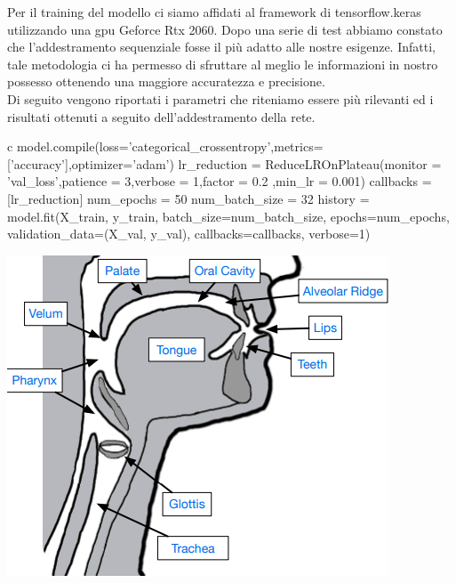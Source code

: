 \documentclass[12pt, a4paper]{article}
\begin{document}
Per il training del modello ci siamo affidati al framework di tensorflow.keras utilizzando una gpu Geforce Rtx 2060. Dopo una serie di test abbiamo constato che l'addestramento sequenziale fosse il più adatto alle nostre esigenze. Infatti, tale metodologia ci ha permesso di sfruttare al meglio le informazioni in nostro possesso ottenendo una maggiore accuratezza e precisione.\\
Di seguito vengono riportati i parametri che riteniamo essere più rilevanti ed i risultati ottenuti a seguito dell'addestramento della rete. 
\begin{code}
\label{code:python-code}
\begin{pythoncode}{c}
model.compile(loss='categorical_crossentropy',metrics=['accuracy'],optimizer='adam')
lr_reduction = ReduceLROnPlateau(monitor = 'val_loss',patience = 3,verbose = 1,factor = 0.2
                                ,min_lr = 0.001)
callbacks = [lr_reduction]
num_epochs = 50
num_batch_size = 32
history = model.fit(X_train,
          y_train,
          batch_size=num_batch_size,
          epochs=num_epochs,
          validation_data=(X_val, y_val),
          callbacks=callbacks,
          verbose=1)
\end{pythoncode}
\end{code}
\begin{minipage}{0.4\textwidth}
\includegraphics[width=\linewidth]{VocalBiologicalTraits.png}
\end{minipage}
\end{document}
